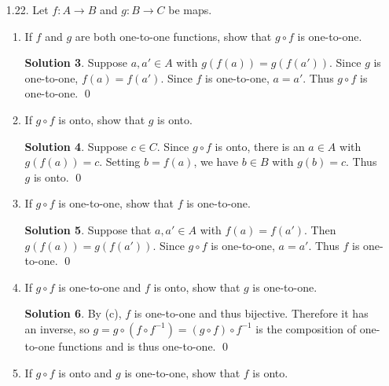 \documentclass{article}
\newcommand{\NN}{\mathbb{N}}
\theoremstyle{definition}
\newtheorem*{solution}{Solution}
\begin{document}
\begin{enumerate}
\begin{enumerate}
\item Define a function $f : \NN \to \NN$ that is one-to-one but not onto.
\begin{solution}
The function $f(n) = n+1$ is one-to-one (if $n+1 = m+1$ then $n=m$) but not onto ($1$ is not in the image since $0 \not\in \NN$).
\end{solution}
\item Define a function $f : \NN \to \NN$ that is onto but not one-to-one.
\begin{solution}
The function $f(n) = \lceil n/2 \rceil$ is onto (given $m$, $f(2m) = m$) but not one-to-one ($f(1) = f(2) = 1$).
\end{solution}
\end{enumerate}
\item[1.22.] Let $f : A \to B$ and $g : B \to C$ be maps.
\begin{enumerate}
\item If $f$ and $g$ are both one-to-one functions, show that $g \circ f$ is one-to-one.
\begin{solution}
Suppose $a, a' \in A$ with $g(f(a)) = g(f(a'))$.  Since $g$ is one-to-one, $f(a) = f(a')$.  Since $f$ is one-to-one, $a = a'$.  Thus $g \circ f$ is one-to-one. \qed
\end{solution}
\item If $g \circ f$ is onto, show that $g$ is onto.
\begin{solution}
Suppose $c \in C$.  Since $g \circ f$ is onto, there is an $a \in A$ with $g(f(a)) = c$.  Setting $b = f(a)$, we have $b \in B$ with $g(b) = c$.  Thus $g$ is onto. \qed
\end{solution}
\item If $g \circ f$ is one-to-one, show that $f$ is one-to-one.
\begin{solution}
Suppose that $a, a' \in A$ with $f(a) = f(a')$.  Then $g(f(a)) = g(f(a'))$.  Since $g\circ f$ is one-to-one, $a = a'$.  Thus $f$ is one-to-one. \qed
\end{solution}
\item If $g \circ f$ is one-to-one and $f$ is onto, show that $g$ is one-to-one.
\begin{solution}
By (c), $f$ is one-to-one and thus bijective.  Therefore it has an inverse, so $g = g \circ (f \circ f^{-1}) = (g \circ f) \circ f^{-1}$ is the composition of one-to-one functions and is thus one-to-one. \qed
\end{solution}
\item If $g \circ f$ is onto and $g$ is one-to-one, show that $f$ is onto.

\end{enumerate}
\end{enumerate}
\end{document}
